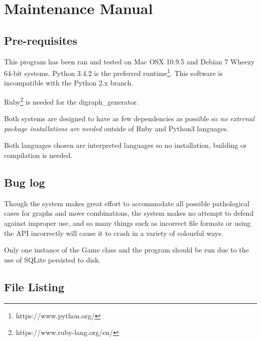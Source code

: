 \documentclass[BSc]{abdnthesis}
\theoremstyle{definition}
\theoremstyle{remark}
\begin{document}
\chapter{Maintenance Manual} \label{appendix:user-manual}

\section{Pre-requisites}
This program has been ran and tested on Mac OSX 10.9.5 and Debian 7 Wheezy 64-bit systems.
Python 3.4.2 is the preferred runtime\footnote{https://www.python.org/}. This software is incompatible with the Python 2.x branch.

Ruby\footnote{https://www.ruby-lang.org/en/} is needed for the digraph\_generator.

Both systems are designed to have as few dependencies as possible so \emph{no external package installations are needed} outside of Ruby and Python3 languages.

Both languages chosen are interpreted languages so no installation, building or compilation is needed.

\section{Bug log}
Though the system makes great effort to accommodate all possible pathological cases for graphs and move combinations, the system makes no attempt to defend against improper use, and so many things such as incorrect file formats or using the API incorrectly will cause it to crash in a variety of colourful ways.

Only one instance of the Game class and the program should be run due to the use of SQLite persisted to disk.

\section{File Listing}
\end{document}
